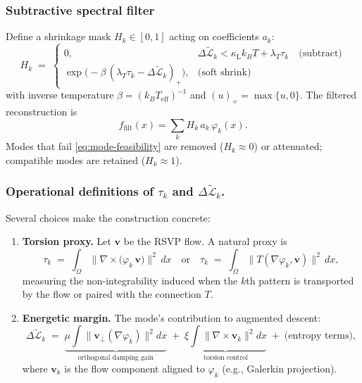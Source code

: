 \documentclass[a4paper,11pt]{article}
\begin{document}
\subsubsection{Subtractive spectral filter}
Define a shrinkage mask $H_k\in[0,1]$ acting on coefficients $a_k$:
\begin{equation}
\label{eq:hard-soft-mask}
H_k \;=\;
\begin{cases}
0, & \Delta\widetilde{\mathcal{L}}_k < \kappa_{\mathrm L}k_B T + \lambda_T \tau_k \quad\text{(subtract)}\\[4pt]
\exp\!\big(-\beta\,(\lambda_T \tau_k - \Delta\widetilde{\mathcal{L}}_k)_+\big), & \text{(soft shrink)}
\end{cases}
\end{equation}
with inverse temperature $\beta=(k_B T_{\mathrm{eff}})^{-1}$ and $(u)_+=\max\{u,0\}$.
The filtered reconstruction is
\begin{equation}
\label{eq:filtered-recon}
f_{\mathrm{filt}}(x)=\sum_{k} H_k\,a_k\,\varphi_k(x).
\end{equation}
Modes that fail \eqref{eq:mode-feasibility} are removed ($H_k\approx0$) or
attenuated; compatible modes are retained ($H_k\approx1$).

\subsubsection{Operational definitions of $\tau_k$ and $\Delta\widetilde{\mathcal{L}}_k$.}
Several choices make the construction concrete:
\begin{enumerate}
\item \textbf{Torsion proxy.} Let $\mathbf v$ be the RSVP flow. A natural proxy is
\begin{equation}
\tau_k \;=\; \int_\Omega \big\|\nabla\times\big(\varphi_k\,\mathbf v\big)\big\|^2\,dx
\quad\text{or}\quad
\tau_k \;=\;\int_\Omega \|T(\nabla\varphi_k,\mathbf v)\|^2\,dx,
\end{equation}
measuring the non-integrability induced when the $k$th pattern is transported by
the flow or paired with the connection $T$.
\item \textbf{Energetic margin.} The mode’s contribution to augmented descent:
\begin{equation}
\Delta\widetilde{\mathcal{L}}_k \;=\; 
\underbrace{\mu \int \|\mathbf v_\perp(\nabla \varphi_k)\|^2 dx}_{\text{orthogonal damping gain}}
\;+\;
\underbrace{\xi \int \|\nabla\times \mathbf v_k\|^2 dx}_{\text{torsion control}}
\;+\;\text{(entropy terms)},
\end{equation}
where $\mathbf v_k$ is the flow component aligned to $\varphi_k$ (e.g.,
Galerkin projection).
\end{enumerate}
\end{document}
